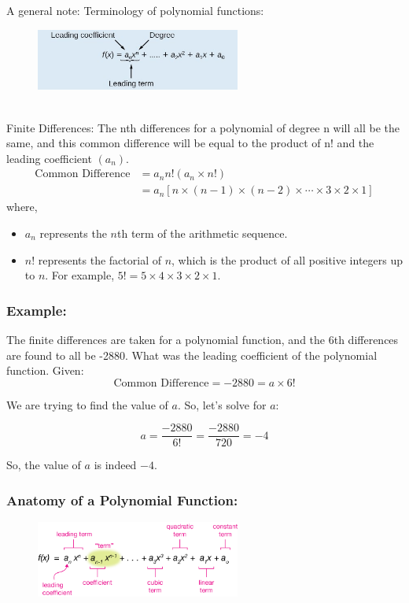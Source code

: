 \documentclass{article}
\begin{document}
A general note: Terminology of polynomial functions:\\
\begin{figure}[h]
    \centering
    \includegraphics[width=0.6\textwidth]{imgs/polynomial.jpg}
\end{figure}\\
Finite Differences: The nth differences for a polynomial of degree n will all
be the same, and this common difference will be equal to the product of n!
and the leading coefficient $(a_n)$.
\begin{align*}
\text{Common Difference} &= a_nn! (a_n \times n!)\\
&= a_n[n \times (n-1) \times (n-2) \times \cdots \times 3 \times 2 \times 1]
\end{align*}
where, 
\begin{itemize}
    \item \(a_n\) represents the \(n\)th term of the arithmetic sequence.
    \item \(n!\) represents the factorial of \(n\), which is the product of all positive integers up to \(n\). For example, \(5! = 5 \times 4 \times 3 \times 2 \times 1\).
\end{itemize}

\subsubsection*{Example:}The finite differences are taken for a polynomial function, and the 6th differences are found to all be -2880. What was the
leading coefficient of the polynomial function.
Given:
\[
\text{Common Difference} = -2880 = a \times 6!
\]

We are trying to find the value of \(a\). So, let's solve for \(a\):

\[a = \frac{-2880}{6!} = \frac{-2880}{720} = -4\]

So, the value of \(a\) is indeed \(-4\).
\subsubsection{Anatomy of a Polynomial Function:}
\begin{figure}[ht]
    \centering
    \includegraphics[width=0.6\textwidth]{imgs/anatomyofapolynomialfunction.png}
\end{figure}
\end{document}
